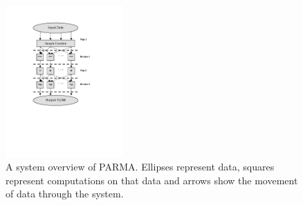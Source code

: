 \begin{figure}[htb]
\centering
\includegraphics[width=0.4\textwidth]{parma/overview.pdf}
\caption{A system overview of PARMA. Ellipses represent data, squares represent
computations on that data and arrows show the movement of data through the
system.}
\label{fig:parmaoverview}
\end{figure}

